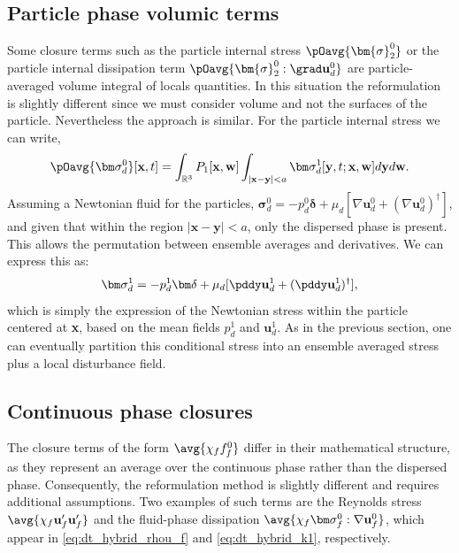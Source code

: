 \subsection{Particle phase volumic terms}

Some closure terms such as the particle internal stress $\pOavg{\bm{\sigma}_2^0}$ or the particle internal dissipation term $\pOavg{\bm{\sigma}_2^0:\grad \textbf{u}_d^0}$ are particle-averaged volume integral of locals quantities. 
In this situation the reformulation is slightly different since we must consider volume and not the surfaces of the particle.  Nevertheless the approach is similar. 
For the particle internal stress we can write, 
\begin{equation}
    \pOavg{\bm\sigma_d^0}[\textbf{x},t]
    =
    \int_{\mathbb{R}^3}
    P_1[\textbf{x},\textbf{w}]
    \int_{|\textbf{x}-\textbf{y}|<a}
    \bm\sigma_d^1[\textbf{y},t;\textbf{x},\textbf{w}] 
    d\textbf{y}
    d\textbf{w}. 
    \label{eq:conditionally_averaged_vol}
\end{equation}
Assuming a Newtonian fluid for the particles, $\bm\sigma_d^0 = -p_d^0 \bm\delta + \mu_d [\nabla \textbf{u}_d^0 + (\nabla \textbf{u}_d^0)^\dagger]$, and given that within the region $|\textbf{x} - \textbf{y}| < a$, only the dispersed phase is present.
This allows the permutation between ensemble averages and derivatives.
We can express this as:
\begin{equation}
    \bm\sigma_d^1  
    = 
    -p_d^1   \bm\delta
    + \mu_d  [\pddy \textbf{u}^1_d+(\pddy  \textbf{u}^1_d)^\dagger],
    \label{eq:dispersed_phase_stress}
\end{equation}
which is simply the expression of the Newtonian stress within the particle centered at \textbf{x}, based on the mean fields $p_d^1$ and $\textbf{u}_d^1$. 
As in the previous section, one can eventually partition this conditional stress into an ensemble averaged stress plus a local disturbance field. 

\subsection{Continuous phase closures}

The closure terms of the form $\avg{\chi_f f_f^0}$ differ in their mathematical structure, as they represent an average over the continuous phase rather than the dispersed phase. 
Consequently, the reformulation method is slightly different and requires additional assumptions. Two examples of such terms are the Reynolds stress $\avg{\chi_f \textbf{u}_f'\textbf{u}_f'}$ and the fluid-phase dissipation $\avg{\chi_f \bm\sigma_f^0 : \nabla \textbf{u}_f^0}$, which appear in \ref{eq:dt_hybrid_rhou_f} and \ref{eq:dt_hybrid_k1}, respectively.  


